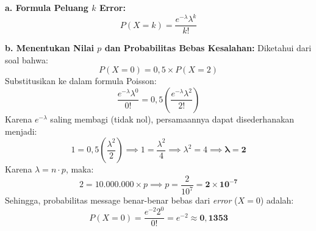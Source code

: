 \documentclass[
  letterpaper,
  DIV=11,
  numbers=noendperiod]{scrartcl}
\begin{document}
\textbf{a. Formula Peluang \(k\) Error:}
\[ P(X = k) = \frac{e^{-\lambda} \lambda^k}{k!} \]

\textbf{b. Menentukan Nilai \(p\) dan Probabilitas Bebas Kesalahan:}
Diketahui dari soal bahwa: \[ P(X = 0) = 0,5 \times P(X = 2) \]
Substitusikan ke dalam formula Poisson:
\[ \frac{e^{-\lambda} \lambda^0}{0!} = 0,5 \left( \frac{e^{-\lambda} \lambda^2}{2!} \right) \]
Karena \(e^{-\lambda}\) saling membagi (tidak nol), persamaannya dapat
disederhanakan menjadi:
\[ 1 = 0,5 \left( \frac{\lambda^2}{2} \right) \implies 1 = \frac{\lambda^2}{4} \implies \lambda^2 = 4 \implies \mathbf{\lambda = 2} \]
Karena \(\lambda = n \cdot p\), maka:
\[ 2 = 10.000.000 \times p \implies p = \frac{2}{10^7} = \mathbf{2 \times 10^{-7}} \]
Sehingga, probabilitas message benar-benar bebas dari \emph{error}
(\(X=0\)) adalah:
\[ P(X = 0) = \frac{e^{-2} 2^0}{0!} = e^{-2} \approx \mathbf{0,1353} \]
\end{document}
